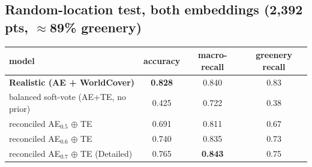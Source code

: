 \documentclass[11pt]{article}
\begin{document}
\subsection*{Random-location test, both embeddings (2{,}392 pts, $\approx$89\% greenery)}
\begin{table}[h]
\centering
\begin{tabular}{l c c c}
\toprule
\textbf{model} & \textbf{accuracy} & \textbf{macro-recall} & \textbf{greenery recall} \\
\midrule
\textbf{Realistic (AE + WorldCover)} & \textbf{0.828} & 0.840 & 0.83 \\
balanced soft-vote (AE+TE, no prior) & 0.425 & 0.722 & 0.38 \\
reconciled AE$_{0.5}$ $\oplus$ TE & 0.691 & 0.811 & 0.67 \\
reconciled AE$_{0.6}$ $\oplus$ TE & 0.740 & 0.835 & 0.73 \\
reconciled AE$_{0.7}$ $\oplus$ TE (Detailed) & 0.765 & \textbf{0.843} & 0.75 \\
\bottomrule
\end{tabular}
\end{table}
\end{document}
